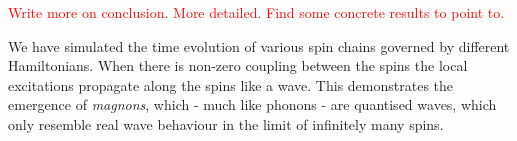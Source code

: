\textcolor{red}{Write more on conclusion. More detailed. Find some concrete results to point to.}

We have simulated the time evolution of various spin chains governed by different Hamiltonians. When there is non-zero coupling between the spins the local excitations propagate along the spins like a wave. This demonstrates the emergence of \textit{magnons}, which - much like phonons - are quantised waves, which only resemble real wave behaviour in the limit of infinitely many spins.